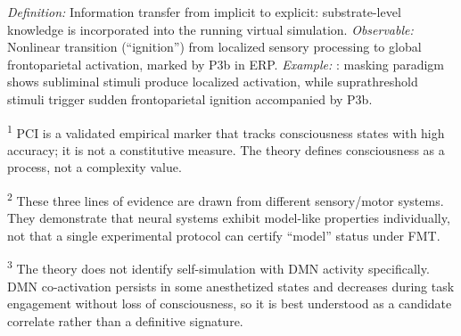 \documentclass[12pt]{article}
\begin{document}
\begin{description}[leftmargin=0pt,labelindent=0pt,itemsep=0.8em]
\item[\textsc{``Becomes conscious''}] \emph{Definition:} Information transfer from implicit to explicit: substrate-level knowledge is incorporated into the running virtual simulation. \emph{Observable:} Nonlinear transition (``ignition'') from localized sensory processing to global frontoparietal activation, marked by P3b in ERP. \emph{Example:} \citet{Dehaene2006}: masking paradigm shows subliminal stimuli produce localized activation, while suprathreshold stimuli trigger sudden frontoparietal ignition accompanied by P3b.

\end{description}


\textsuperscript{1} PCI is a validated empirical marker that tracks consciousness states with high accuracy; it is not a constitutive measure. The theory defines consciousness as a process, not a complexity value.

\textsuperscript{2} These three lines of evidence are drawn from different sensory/motor systems. They demonstrate that neural systems exhibit model-like properties individually, not that a single experimental protocol can certify ``model'' status under FMT.

\textsuperscript{3} The theory does not identify self-simulation with DMN activity specifically. DMN co-activation persists in some anesthetized states and decreases during task engagement without loss of consciousness, so it is best understood as a candidate correlate rather than a definitive signature.
\end{document}

